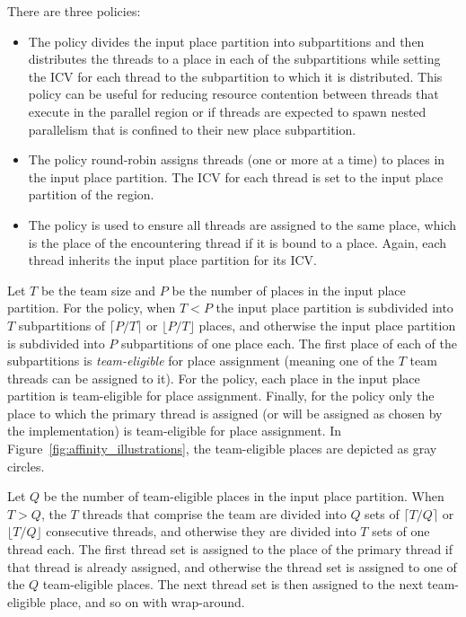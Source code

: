 There are three policies:

\begin{itemize}
\item The  policy divides the input place partition into
subpartitions and then distributes the threads to a place in each of the
subpartitions while setting the  ICV for each
thread to the subpartition to which it is distributed. This policy
can be useful for reducing resource contention between threads that
execute in the parallel region or if threads are expected to spawn
nested parallelism that is confined to their new place subpartition. 

\item The  policy round-robin assigns threads (one or more at a
time) to places in the input place partition. The 
ICV for each thread is set to the input place partition of the region.

\item The  policy is used to ensure all threads are assigned to
the same place, which is the place of the encountering thread if it is bound to
a place. Again, each thread inherits the input place partition for its
 ICV.
\end{itemize} 

Let $T$ be the team size and $P$ be the number of places in the input place
partition. For the  policy, when $T < P$ the input place
partition is subdivided into $T$ subpartitions of $\lceil P/T \rceil$ or
$\lfloor P/T \rfloor$ places, and otherwise the input place partition is
subdivided into $P$ subpartitions of one place each. The first place of each of
the subpartitions is \emph{team-eligible} for place assignment (meaning one of
the $T$ team threads can be assigned to it). For the  policy, each
place in the input place partition is team-eligible for place assignment.
Finally, for the  policy only the place to which the primary
thread is assigned (or will be assigned as chosen by the implementation) is
team-eligible for place assignment. In Figure~\ref{fig:affinity_illustrations},
the team-eligible places are depicted as gray circles.

Let $Q$ be the number of team-eligible places in the input place partition. When
$T > Q$, the $T$ threads that comprise the team are divided into $Q$ sets of
$\lceil T/Q \rceil$ or $\lfloor T/Q \rfloor$ consecutive threads, and otherwise
they are divided into $T$ sets of one thread each. The first thread set is
assigned to the place of the primary thread if that thread is already assigned,
and otherwise the thread set is assigned to one of the $Q$ team-eligible
places. The next thread set is then assigned to the next team-eligible place,
and so on with wrap-around.

